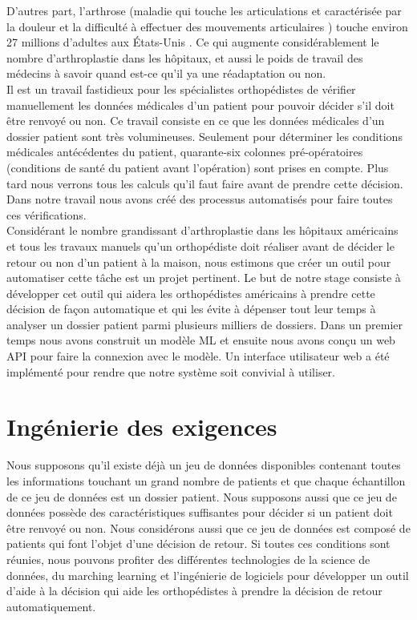 \documentclass[12pt, french]{report}
\begin{document}
D'autres part, l'arthrose (maladie qui touche les articulations et caractérisée par la douleur et la difficulté à effectuer des mouvements articulaires \cite{key12}) touche environ 27 millions d'adultes aux États-Unis \cite{key11}.  Ce qui augmente considérablement le nombre d'arthroplastie dans les hôpitaux, et aussi le poids de travail des médecins à savoir quand est-ce qu'il ya une réadaptation ou non.\\

Il est un travail fastidieux pour les spécialistes orthopédistes de vérifier manuellement les données médicales d'un patient pour pouvoir décider s'il doit être renvoyé ou non. Ce travail consiste en ce que les données médicales d'un dossier patient sont très volumineuses. Seulement pour déterminer les conditions médicales antécédentes du patient, quarante-six colonnes pré-opératoires (conditions de santé du patient avant l'opération) sont prises en compte. Plus tard nous verrons tous les calculs qu'il faut faire avant de prendre cette décision. Dans notre travail nous avons créé des processus automatisés pour faire toutes ces vérifications.  \\

Considérant le nombre grandissant d'arthroplastie dans les hôpitaux américains et tous les travaux manuels qu'un orthopédiste doit réaliser avant de décider le retour ou non d'un patient à la maison, nous estimons que créer un outil pour automatiser cette tâche est un projet pertinent. Le but de notre stage consiste à développer cet outil qui aidera les orthopédistes américains à prendre cette décision de façon automatique et qui les évite à dépenser tout leur temps à analyser un dossier patient parmi plusieurs milliers de dossiers. Dans un premier temps nous avons construit un modèle ML et ensuite nous avons conçu un web API pour faire la connexion avec le modèle. Un interface utilisateur web a été implémenté pour rendre que notre système soit convivial à utiliser.\\

\section{Ingénierie des exigences}

Nous supposons qu'il existe déjà un jeu de données disponibles contenant toutes les informations touchant un grand nombre de patients et que chaque échantillon de ce jeu de données est un dossier patient. Nous supposons aussi que ce jeu de données possède des caractéristiques suffisantes pour décider si un patient doit être renvoyé ou non. Nous considérons aussi que ce jeu de données est composé de patients qui font l'objet d'une décision de retour. Si toutes ces conditions sont réunies, nous pouvons profiter des différentes technologies de la science de données, du marching learning et l'ingénierie de logiciels pour développer un outil d'aide à la décision qui aide les orthopédistes à prendre la décision de retour automatiquement. \\
\end{document}
